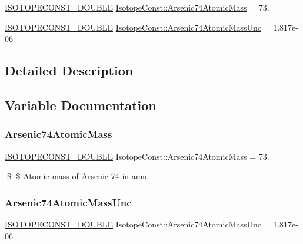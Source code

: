 \begin{DoxyCompactItemize}
\item 
\mbox{\hyperlink{group___isotope_const-_macros_ga8f45a7272ce02c0b4c65c44636ed719a}{I\+S\+O\+T\+O\+P\+E\+C\+O\+N\+S\+T\+\_\+\+D\+O\+U\+B\+LE}} \mbox{\hyperlink{group___isotope_const-_arsenic-_as74_gac88b57d4bc49112c88494ade9da13c91}{Isotope\+Const\+::\+Arsenic74\+Atomic\+Mass}} = 73.
\item 
\mbox{\hyperlink{group___isotope_const-_macros_ga8f45a7272ce02c0b4c65c44636ed719a}{I\+S\+O\+T\+O\+P\+E\+C\+O\+N\+S\+T\+\_\+\+D\+O\+U\+B\+LE}} \mbox{\hyperlink{group___isotope_const-_arsenic-_as74_ga0dafb60f22dc25c225d31c690f7c6e12}{Isotope\+Const\+::\+Arsenic74\+Atomic\+Mass\+Unc}} = 1.\+817e-\/06
\end{DoxyCompactItemize}


\subsection{Detailed Description}


\subsection{Variable Documentation}
\mbox{\label{group___isotope_const-_arsenic-_as74_gac88b57d4bc49112c88494ade9da13c91}} 
\subsubsection{\texorpdfstring{Arsenic74\+Atomic\+Mass}{Arsenic74AtomicMass}}
{\footnotesize\ttfamily \mbox{\hyperlink{group___isotope_const-_macros_ga8f45a7272ce02c0b4c65c44636ed719a}{I\+S\+O\+T\+O\+P\+E\+C\+O\+N\+S\+T\+\_\+\+D\+O\+U\+B\+LE}} Isotope\+Const\+::\+Arsenic74\+Atomic\+Mass = 73.}

\$ \$ Atomic mass of Arsenic-\/74 in amu. \mbox{\label{group___isotope_const-_arsenic-_as74_ga0dafb60f22dc25c225d31c690f7c6e12}} 
\subsubsection{\texorpdfstring{Arsenic74\+Atomic\+Mass\+Unc}{Arsenic74AtomicMassUnc}}
{\footnotesize\ttfamily \mbox{\hyperlink{group___isotope_const-_macros_ga8f45a7272ce02c0b4c65c44636ed719a}{I\+S\+O\+T\+O\+P\+E\+C\+O\+N\+S\+T\+\_\+\+D\+O\+U\+B\+LE}} Isotope\+Const\+::\+Arsenic74\+Atomic\+Mass\+Unc = 1.\+817e-\/06}

